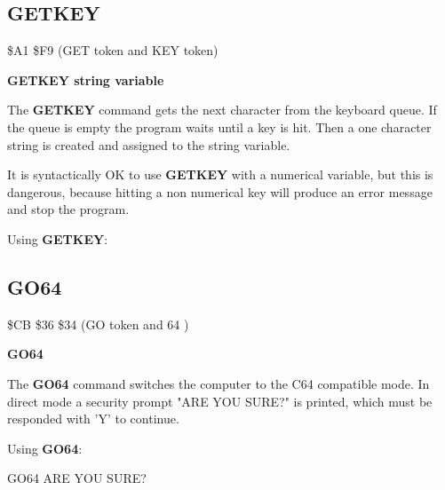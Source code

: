 \subsection{GETKEY}
\begin{description}[leftmargin=3cm,style=nextline]
\item [Token:] \$A1 \$F9 (GET token and KEY token)
\item [Format:] {\bf GETKEY string variable}
\item [Usage:] The {\bf GETKEY} command gets the next character
               from the keyboard queue. If the queue is empty
               the program waits until a key is hit.
               Then a one character string is created
               and assigned to the string variable.

\item [Remarks:] It is syntactically OK to use {\bf GETKEY} with
               a numerical variable, but this is dangerous,
               because hitting a non numerical key will produce
               an error message and stop the program.

\item [Example:] Using {\bf GETKEY}:
\end{description}


\newpage
\subsection{GO64}
\begin{description}[leftmargin=3cm,style=nextline]
\item [Token:] \$CB \$36 \$34 (GO token and 64 )
\item [Format:] {\bf GO64}
\item [Usage:] The {\bf GO64} command switches the
               computer to the C64 compatible mode.
               In direct mode a security prompt
               "ARE YOU SURE?" is printed, which must
               be responded with 'Y' to continue.

\item [Example:] Using {\bf GO64}:
\begin{screenoutput}
GO64
ARE YOU SURE?
\end{screenoutput}
\end{description}

